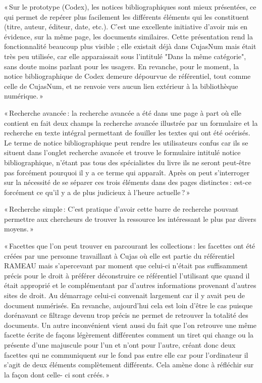 « Sur le prototype (Codex), les notices bibliographiques sont mieux présentées, ce qui permet de repérer plus facilement les différents éléments qui les constituent (titre, auteur, éditeur, date, etc.). C’est une excellente initiative d'avoir mis en évidence, sur la même page, les documents similaires. Cette présentation rend la fonctionnalité beaucoup plus visible ; elle existait déjà dans CujasNum mais était très peu utilisée, car elle apparaissait sous l'intitulé "Dans la même catégorie", sans doute moins parlant pour les usagers. En revanche, pour le moment, la notice bibliographique de Codex demeure dépourvue de référentiel, tout comme celle de CujasNum, et ne renvoie vers aucun lien extérieur à la bibliothèque numérique. » 

« Recherche avancée : la recherche avancée a été dans une page à part où elle contient en fait deux champs la recherche avancée illustrée par un formulaire et la recherche en texte intégral permettant de fouiller les textes qui ont été océrisés. Le terme de notice bibliographique peut rendre les utilisateurs confus car ils se situent dans l’onglet recherche avancée et trouve le formulaire intitulé notice bibliographique, n’étant pas tous des spécialistes du livre ils ne seront peut-être pas forcément pourquoi il y a ce terme qui apparaît. Après on peut s’interroger sur la nécessité de se séparer ces trois éléments dans des pages distinctes : est-ce forcément ce qu’il y a de plus judicieux à l’heure actuelle ? » 

« Recherche simple : C’est pratique d’avoir cette barre de recherche pouvant permettre aux chercheurs de trouver la ressource les intéressant le plus par divers moyens. »  

« Facettes que l’on peut trouver en parcourant les collections : les facettes ont été créées par une personne travaillant à Cujas où elle est partie du référentiel RAMEAU mais s’apercevant par moment que celui-ci n’était pas suffisamment précis pour le droit à préférer déconstruire ce référentiel l’utilisant que quand il était approprié et le complémentant par d’autres informations provenant d’autres sites de droit. Au démarrage celui-ci convenait largement car il y avait peu de document numérisés. En revanche, aujourd’hui cela est loin d’être le cas puisque dorénavant ce filtrage devenu trop précis ne permet de retrouver la totalité des documents. Un autre inconvénient vient aussi du fait que l’on retrouve une même facette écrite de façons légèrement différentes comment un tiret qui change ou la présente d’une majuscule pour l’un et n’ont pour l’autre, créant donc deux facettes qui ne communiquent sur le fond pas entre elle car pour l’ordinateur il s’agit de deux éléments complètement différents. Cela amène donc à réfléchir sur la façon dont celle- ci sont créés. » 

